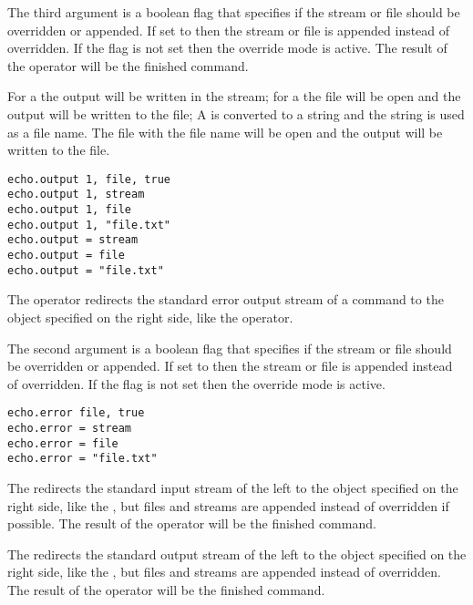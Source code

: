 The third argument is a boolean flag that specifies if the stream or file should
be overridden or appended. If set to  then the stream or file
is appended instead of overridden. If the flag is not set then the override
mode is active.
The result of the operator will be the finished command.

For a \TypeStream the output will be written in the stream; 
for a \TypeFile the file will be open and the output will be written to the file;
A \TypeGenericObject is converted to a string and the string is used as a file name. 
The file with the file name will be open and the output will be written to the file.

\begin{lstlisting}[style=Groovybash, label={lst:example_output1_op}]
echo.output 1, file, true
echo.output 1, stream
echo.output 1, file
echo.output 1, "file.txt"
echo.output = stream
echo.output = file
echo.output = "file.txt"
\end{lstlisting}

%

The  operator redirects the standard error output stream of
a command to the object specified on the right side, like the  operator.

The second argument is a boolean flag that specifies if the stream or file should
be overridden or appended. If set to  then the stream or file
is appended instead of overridden. If the flag is not set then the override
mode is active.

\begin{lstlisting}[style=Groovybash, label={lst:example_error_op}]
echo.error file, true
echo.error = stream
echo.error = file
echo.error = "file.txt"
\end{lstlisting}

%

The \Operator{<<} redirects the standard input stream of the left to 
the object specified on the right side, like the , but
files and streams are appended instead of overridden if possible. 
The result of the operator will be the finished command.

%

The \Operator{>>} redirects the standard output stream of
the left to the object specified on the right side, like the , but
files and streams are appended instead of overridden.
The result of the operator will be the finished command.

